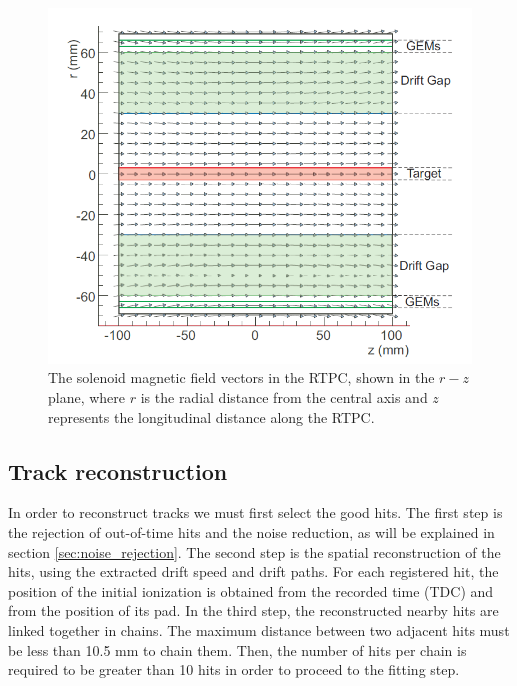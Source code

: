 \begin{figure}[tp]
\centering
\includegraphics[scale=0.40]{fig_rtpc/B_MAP.png}
\caption[]{The solenoid magnetic field vectors in the RTPC, shown in the $r-z$ 
plane, where $r$ is the radial distance from the central axis and $z$ 
represents the longitudinal distance along the RTPC.} \label{fig:B_MAP}
\end{figure}

\subsection{Track reconstruction}
In order to reconstruct tracks we must first select the good hits. The 
first step is the rejection of out-of-time hits and the noise reduction, as 
will be explained in section \ref{sec:noise_rejection}. The second step is the 
spatial reconstruction of the hits, using the extracted drift speed and drift 
paths. For each registered hit, the position of the initial ionization is 
obtained from the recorded time (TDC) and from the position of its pad. In the 
third step, the reconstructed nearby hits are linked together in chains. The 
maximum distance between two adjacent hits must be less than 10.5 mm to chain 
them. Then, the number of hits per chain is required to be greater than 10 hits 
in order to proceed to the fitting step. 

